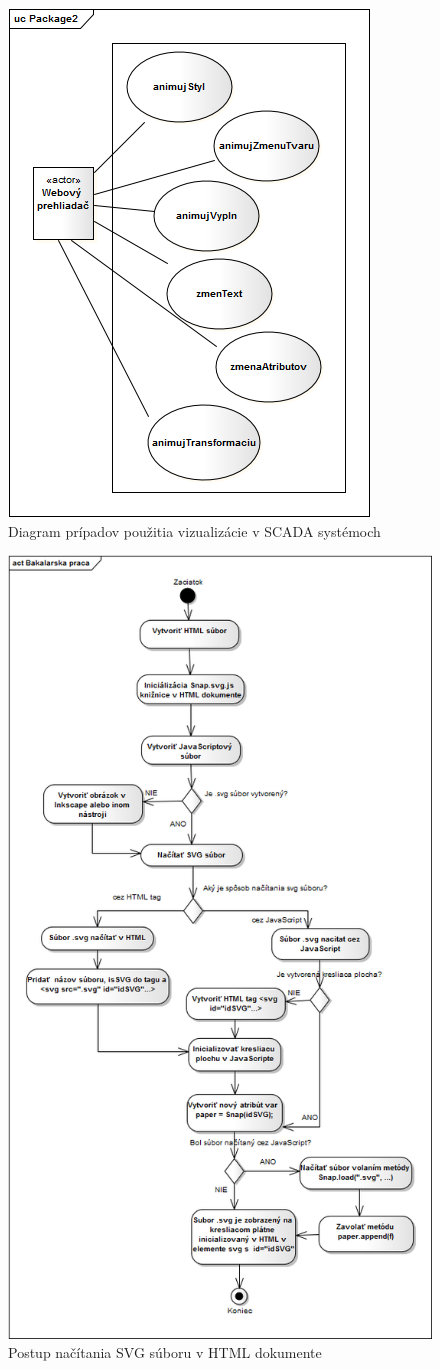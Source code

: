 \begin{figure}[H]
		\centering
		\includegraphics[width=0.4\linewidth]{uml/usecase_update.png}
		\caption{Diagram prípadov použitia vizualizácie v SCADA systémoch}
		\label{fig:USECASE}
	\end{figure}

	
	\begin{figure}[H]
		\centering
		\includegraphics[width=0.6\linewidth]{uml/aktivityInicializacie.png}
		\caption{Postup načítania SVG súboru v HTML dokumente}
		\label{fig:aktivity1}
\end{figure}

